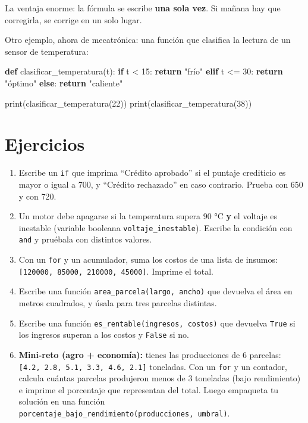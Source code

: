 \documentclass[
  spanish,
  letterpaper,
  DIV=11,
  numbers=noendperiod]{scrreprt}
\newenvironment{Shaded}{\begin{snugshade}}{\end{snugshade}}
\newcommand{\BuiltInTok}[1]{\textcolor[rgb]{0.00,0.23,0.31}{#1}}
\newcommand{\ControlFlowTok}[1]{\textcolor[rgb]{0.00,0.23,0.31}{\textbf{#1}}}
\newcommand{\DecValTok}[1]{\textcolor[rgb]{0.68,0.00,0.00}{#1}}
\newcommand{\KeywordTok}[1]{\textcolor[rgb]{0.00,0.23,0.31}{\textbf{#1}}}
\newcommand{\NormalTok}[1]{\textcolor[rgb]{0.00,0.23,0.31}{#1}}
\newcommand{\OperatorTok}[1]{\textcolor[rgb]{0.37,0.37,0.37}{#1}}
\newcommand{\StringTok}[1]{\textcolor[rgb]{0.13,0.47,0.30}{#1}}
\providecommand{\tightlist}{%
  \setlength{\itemsep}{0pt}\setlength{\parskip}{0pt}}
\begin{document}
La ventaja enorme: la fórmula se escribe \textbf{una sola vez}. Si
mañana hay que corregirla, se corrige en un solo lugar.

Otro ejemplo, ahora de mecatrónica: una función que clasifica la lectura
de un sensor de temperatura:

\begin{Shaded}
\begin{Highlighting}[]
\KeywordTok{def}\NormalTok{ clasificar\_temperatura(t):}
    \ControlFlowTok{if}\NormalTok{ t }\OperatorTok{\textless{}} \DecValTok{15}\NormalTok{:}
        \ControlFlowTok{return} \StringTok{"frío"}
    \ControlFlowTok{elif}\NormalTok{ t }\OperatorTok{\textless{}=} \DecValTok{30}\NormalTok{:}
        \ControlFlowTok{return} \StringTok{"óptimo"}
    \ControlFlowTok{else}\NormalTok{:}
        \ControlFlowTok{return} \StringTok{"caliente"}

\BuiltInTok{print}\NormalTok{(clasificar\_temperatura(}\DecValTok{22}\NormalTok{))}
\BuiltInTok{print}\NormalTok{(clasificar\_temperatura(}\DecValTok{38}\NormalTok{))}
\end{Highlighting}
\end{Shaded}

\section{Ejercicios}\label{ejercicios-2}

\begin{enumerate}
\def\labelenumi{\arabic{enumi}.}
\tightlist
\item
  Escribe un \texttt{if} que imprima ``Crédito aprobado'' si el puntaje
  crediticio es mayor o igual a 700, y ``Crédito rechazado'' en caso
  contrario. Prueba con 650 y con 720.
\item
  Un motor debe apagarse si la temperatura supera 90 °C \textbf{y} el
  voltaje es inestable (variable booleana \texttt{voltaje\_inestable}).
  Escribe la condición con \texttt{and} y pruébala con distintos
  valores.
\item
  Con un \texttt{for} y un acumulador, suma los costos de una lista de
  insumos: \texttt{{[}120000,\ 85000,\ 210000,\ 45000{]}}. Imprime el
  total.
\item
  Escribe una función \texttt{area\_parcela(largo,\ ancho)} que devuelva
  el área en metros cuadrados, y úsala para tres parcelas distintas.
\item
  Escribe una función \texttt{es\_rentable(ingresos,\ costos)} que
  devuelva \texttt{True} si los ingresos superan a los costos y
  \texttt{False} si no.
\item
  \textbf{Mini-reto (agro + economía):} tienes las producciones de 6
  parcelas: \texttt{{[}4.2,\ 2.8,\ 5.1,\ 3.3,\ 4.6,\ 2.1{]}} toneladas.
  Con un \texttt{for} y un contador, calcula cuántas parcelas produjeron
  menos de 3 toneladas (bajo rendimiento) e imprime el porcentaje que
  representan del total. Luego empaqueta tu solución en una función
  \texttt{porcentaje\_bajo\_rendimiento(producciones,\ umbral)}.
\end{enumerate}
\end{document}
